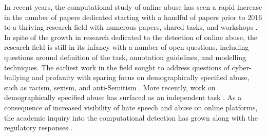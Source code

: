 In recent years, the computational study of online abuse has seen a rapid increase in the number of papers dedicated starting with a handful of papers prior to $2016$ to a thriving research field with numerous papers, shared tasks, and workshops \citep{Vidgen:2020}. In spite of the growth in research dedicated to the detection of online abuse, the research field is still in its infancy with a number of open questions, including questions around definition of the task, annotation guidelines, and modelling techniques.
The earliest work in the field sought to address questions of cyber-bullying \citep{Chen:2012,Cho:2013,Reynolds:2011} and profanity \citep{Sood:profanity:2012,Sood:2013} with sparing focus on demographically specified abuse, such as racism, sexism, and anti-Semitism \citep{Warner:2012}. More recently, work on demographically specified abuse has surfaced as an independent task \citep{Tulkens:2015,Waseem:2016,Waseem-Hovy:2016,Park:2017,Samghabadi:2017,Karan:2018,Gorrell:2018,Stoop:2019,Meyer:2019,Palmer:2020,Vidgen:2020}. As a consequence of increased visibility of hate speech and abuse on online platforms, the academic inquiry into the computational detection has grown along with the regulatory responses \citep{Regulatory stuff: NetzDG, EUcommision on hate speech}.

